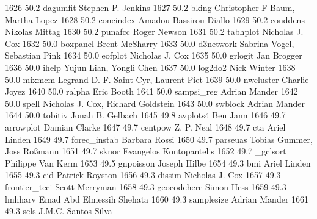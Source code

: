   1626     50.2    dagumfit      Stephen P. Jenkins                      
  1627     50.2    bking         Christopher F Baum, Martha Lopez        
  1628     50.2    concindex     Amadou Bassirou Diallo                  
  1629     50.2    conddens      Nikolas Mittag                          
  1630     50.2    punafcc       Roger Newson                            
  1631     50.2    tabhplot      Nicholas J. Cox                         
  1632     50.0    boxpanel      Brent McSharry                          
  1633     50.0    d3network     Sabrina Vogel, Sebastian Pink           
  1634     50.0    eofplot       Nicholas J. Cox                         
  1635     50.0    grlogit       Jan Brogger                             
  1636     50.0    ihelp         Yujun Lian, Yongli Chen                 
  1637     50.0    log2do2       Nick Winter                             
  1638     50.0    mixmcm        Legrand D. F. Saint-Cyr, Laurent Piet   
  1639     50.0    nwcluster     Charlie Joyez                           
  1640     50.0    ralpha        Eric Booth                              
  1641     50.0    sampsi_reg    Adrian Mander                           
  1642     50.0    spell         Nicholas J. Cox, Richard Goldstein      
  1643     50.0    swblock       Adrian Mander                           
  1644     50.0    tobitiv       Jonah B. Gelbach                        
  1645     49.8    avplots4      Ben Jann                                
  1646     49.7    arrowplot     Damian Clarke                           
  1647     49.7    centpow       Z. P. Neal                              
  1648     49.7    cta           Ariel Linden                            
  1649     49.7    forec_instab  Barbara Rossi                           
  1650     49.7    parseuas      Tobias Gummer, Joss Roßmann            
  1651     49.7    sknor         Evangelos Kontopantelis                 
  1652     49.7    _gclsort      Philippe Van Kerm                       
  1653     49.5    gnpoisson     Joseph Hilbe                            
  1654     49.3    bmi           Ariel Linden                            
  1655     49.3    cid           Patrick Royston                         
  1656     49.3    dissim        Nicholas J. Cox                         
  1657     49.3    frontier_teci  Scott Merryman                          
  1658     49.3    geocodehere   Simon Hess                              
  1659     49.3    lmhharv       Emad Abd Elmessih Shehata               
  1660     49.3    samplesize    Adrian Mander                           
  1661     49.3    scls          J.M.C. Santos Silva                     
